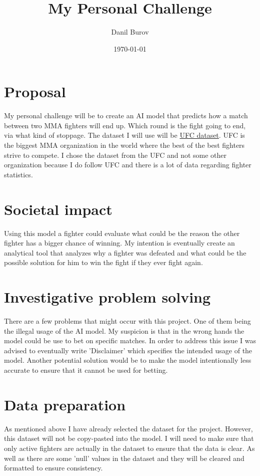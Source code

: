 \documentclass{article}
\title{My Personal Challenge}
\author{Danil Burov}
\date{\today}
\begin{document}
\maketitle

\section{Proposal}

My personal challenge will be to create an AI model that predicts how a match between two
MMA fighters will end up. Which round is the fight going to end, via what kind of stoppage. 
The dataset I will use will be \href{https://www.kaggle.com/datasets/asaniczka/ufc-fighters-statistics}{UFC dataset}.
UFC is the biggest MMA organization in the world where the best of the best fighters strive to
compete. I chose the dataset from the UFC and not some other organization because I do follow UFC
and there is a lot of data regarding fighter statistics.

\section{Societal impact}
Using this model a fighter could evaluate what could be the reason the other fighter has a bigger
chance of winning. My intention is eventually create an analytical tool that analyzes why a fighter 
was defeated and what could be the possible solution for him to win the fight if they ever fight again.

\section{Investigative problem solving}
There are a few problems that might occur with this project. One of them being the illegal usage of the
AI model. My suspicion is that in the wrong hands the model could be use to bet on specific matches. In order 
to address this issue I was advised to eventually write 'Disclaimer' which specifies the intended usage of the model. 
Another potential solution would be to make the model intentionally less accurate to ensure that it cannot be used for betting.

\section{Data preparation}
As mentioned above I have already selected the dataset for the project. However, this dataset will not be copy-pasted into 
the model. I will need to make sure that only active fighters are actually in the dataset to ensure that the data is clear. 
As well as there are some 'null' values in the dataset and they will be cleared and formatted to ensure consistency.
\end{document}
